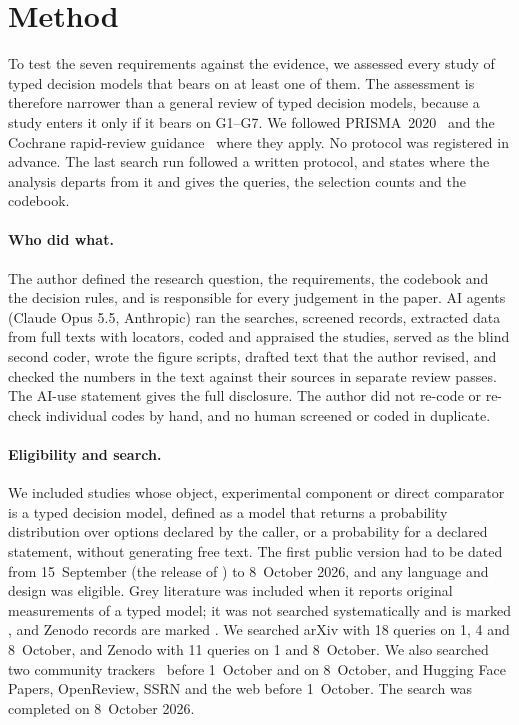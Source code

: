 \section{Method}
\label{sec:method}

To test the seven requirements against the evidence, we assessed every study of typed decision models that bears on at least one of them.
The assessment is therefore narrower than a general review of typed decision models, because a study enters it only if it bears on G1--G7.
We followed PRISMA~2020~\cite{page2021prisma} and the Cochrane rapid-review guidance~\cite{garritty2021cochrane} where they apply.
No protocol was registered in advance. The last search run followed a written protocol, and  states where the analysis departs from it and gives the queries, the selection counts and the codebook.

\paragraph{Who did what.}
The author defined the research question, the requirements, the codebook and the decision rules, and is responsible for every judgement in the paper.
AI agents (Claude Opus 5.5, Anthropic) ran the searches, screened records, extracted data from full texts with locators, coded and appraised the studies, served as the blind second coder, wrote the figure scripts, drafted text that the author revised, and checked the numbers in the text against their sources in separate review passes. The AI-use statement gives the full disclosure.
The author did not re-code or re-check individual codes by hand, and no human screened or coded in duplicate.

\paragraph{Eligibility and search.}
We included studies whose object, experimental component or direct comparator is a typed decision model, defined as a model that returns a probability distribution over options declared by the caller, or a probability for a declared statement, without generating free text.
The first public version had to be dated from 15~September (the release of \jev{}) to 8~October 2026, and any language and design was eligible.
Grey literature was included when it reports original measurements of a typed model; it was not searched systematically and is marked \gmark{}, and Zenodo records are marked \zmark{}.
We searched arXiv with 18 queries on 1, 4 and 8~October, and Zenodo with 11 queries on 1 and 8~October.
We also searched two community trackers~\cite{xiao2026allaboutjev,rafe2026awesome} before 1~October and on 8~October, and Hugging Face Papers, OpenReview, SSRN and the web before 1~October. The search was completed on 8~October 2026.

